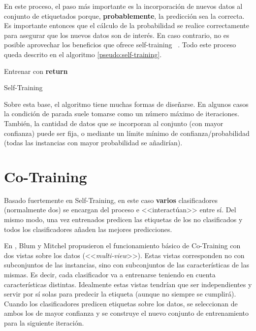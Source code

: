 En este proceso, el paso más importante es la incorporación de nuevos datos al
conjunto de etiquetados porque, \textbf{probablemente}, la predicción sea la
correcta. Es importante entonces que el cálculo de la probabilidad se realice
correctamente para asegurar que los nuevos datos son de interés. En caso
contrario, no es posible aprovechar los beneficios que ofrece self-training~
\cite{vanEngelen2020}. Todo este proceso queda descrito en el algoritmo
\ref{pseudo:self-training}.

\begin{algorithm}
    \DontPrintSemicolon
     Entrenar  con \;
     \textbf{return} 
     \caption{Self-Training}\label{pseudo:self-training}
\end{algorithm}

Sobre esta base, el algoritmo tiene muchas formas de diseñarse. En algunos casos
la condición de parada suele tomarse como un número máximo de iteraciones.
También, la cantidad de datos que se incorporan al conjunto 
(con mayor confianza) puede ser fija, o mediante un límite mínimo de
confianza/probabilidad (todas las instancias con mayor probabilidad se
añadirían).

\section{Co-Training}
Basado fuertemente en Self-Training, en este caso \textbf{varios} clasificadores
(normalmente dos) se encargan del proceso e <<interactúan>> entre sí. Del mismo
modo, una vez entrenados predicen las etiquetas de los no clasificados y todos
los clasificadores añaden las mejores predicciones.

En \cite{blum1998combining}, Blum y Mitchel propusieron el funcionamiento básico
de Co-Training con dos vistas sobre los datos (<<\emph{multi-view}>>). Estas
vistas corresponden no con subconjuntos de las instancias, sino con subconjuntos
de las características de las mismas. Es decir, cada clasificador va a
entrenarse teniendo en cuenta características distintas. Idealmente estas vistas
tendrían que ser independientes y servir por sí solas para predecir la etiqueta
(aunque no siempre se cumplirá). Cuando los clasificadores predicen etiquetas
sobre los datos, se seleccionan de ambos los de mayor confianza y se construye
el nuevo conjunto de entrenamiento para la siguiente iteración.


